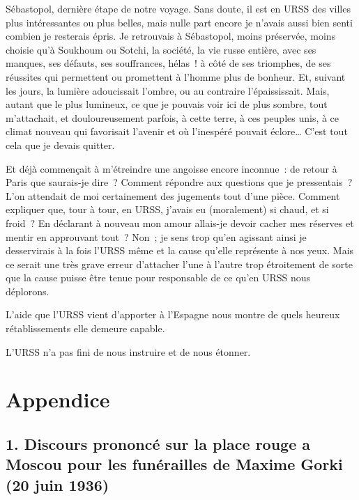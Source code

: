 \documentclass[twoside]{book} %
\newcommand{\astermono}{\medskip\centerline{\color{rubric}\large\selectfont{\syms ✻}}\medskip\par}%
\newcommand\chapteropen{} %
\newcommand\chaptercont{} %
\newcommand\chapterclose{} %
\begin{document}
\chaptercont
\noindent Sébastopol, dernière étape de notre voyage. Sans doute, il est en URSS des villes plus intéressantes ou plus belles, mais nulle part encore je n’avais aussi bien senti combien je resterais épris. Je retrouvais à Sébastopol, moins préservée, moins choisie qu’à Soukhoum ou Sotchi, la société, la vie russe entière, avec ses manques, ses défauts, ses souffrances, hélas ! à côté de ses triomphes, de ses réussites qui permettent ou promettent à l’homme plus de bonheur. Et, suivant les jours, la lumière adoucissait l’ombre, ou au contraire l’épaississait. Mais, autant que le plus lumineux, ce que je pouvais voir ici de plus sombre, tout m’attachait, et douloureusement parfois, à cette terre, à ces peuples unis, à ce climat nouveau qui favorisait l’avenir et où l’inespéré pouvait éclore… C’est tout cela que je devais quitter.\par
Et déjà commençait à m’étreindre une angoisse encore inconnue : de retour à Paris que saurais-je dire ? Comment répondre aux questions que je pressentais ? L’on attendait de moi certainement des jugements tout d’une pièce. Comment expliquer que, tour à tour, en URSS, j’avais eu (moralement) si chaud, et si froid ? En déclarant à nouveau mon amour allais-je devoir cacher mes réserves et mentir en approuvant tout ? Non ; je sens trop qu’en agissant ainsi je desservirais à la fois l’URSS même et la cause qu’elle représente à nos yeux. Mais ce serait une très grave erreur d’attacher l’une à l’autre trop étroitement de sorte que la cause puisse être tenue pour responsable de ce qu’en URSS nous déplorons.\par

\astermono

\noindent L’aide que l’URSS vient d’apporter à l’Espagne nous montre de quels heureux rétablissements elle demeure capable.\par
L’URSS n’a pas fini de nous instruire et de nous étonner.
\chapterclose


\chapteropen

\chapter[{Appendice}]{Appendice}
\renewcommand{\leftmark}{Appendice}


\chaptercont

\section[{1. Discours prononcé sur la place rouge a Moscou pour les funérailles de Maxime Gorki (20 juin 1936)}]{1. Discours prononcé sur la place rouge a Moscou pour les funérailles de Maxime Gorki (20 juin 1936)}
\end{document}
